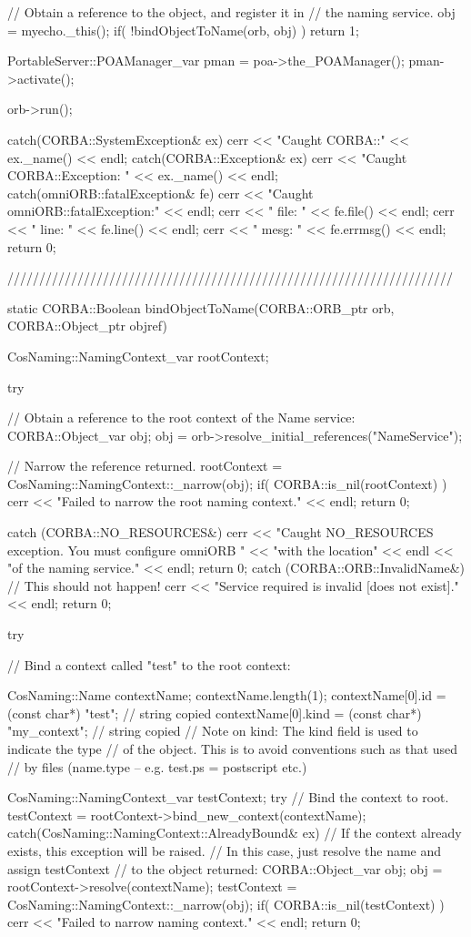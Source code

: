 \documentclass[11pt,twoside,a4paper]{book}
\begin{document}
\begin{cxxlisting}
{{    // Obtain a reference to the object, and register it in
    // the naming service.
    obj = myecho._this();
    if( !bindObjectToName(orb, obj) )
      return 1;

    PortableServer::POAManager_var pman = poa->the_POAManager();
    pman->activate();

    orb->run();
  }
  catch(CORBA::SystemException& ex) {
    cerr << "Caught CORBA::" << ex._name() << endl;
  }
  catch(CORBA::Exception& ex) {
    cerr << "Caught CORBA::Exception: " << ex._name() << endl;
  }
  catch(omniORB::fatalException& fe) {
    cerr << "Caught omniORB::fatalException:" << endl;
    cerr << "  file: " << fe.file() << endl;
    cerr << "  line: " << fe.line() << endl;
    cerr << "  mesg: " << fe.errmsg() << endl;
  }
  return 0;
}

//////////////////////////////////////////////////////////////////////

static CORBA::Boolean
bindObjectToName(CORBA::ORB_ptr orb, CORBA::Object_ptr objref)
{
  CosNaming::NamingContext_var rootContext;

  try {
    // Obtain a reference to the root context of the Name service:
    CORBA::Object_var obj;
    obj = orb->resolve_initial_references("NameService");

    // Narrow the reference returned.
    rootContext = CosNaming::NamingContext::_narrow(obj);
    if( CORBA::is_nil(rootContext) ) {
      cerr << "Failed to narrow the root naming context." << endl;
      return 0;
    }
  }
  catch (CORBA::NO_RESOURCES&) {
    cerr << "Caught NO_RESOURCES exception. You must configure omniORB "
	 << "with the location" << endl
	 << "of the naming service." << endl;
    return 0;
  }
  catch (CORBA::ORB::InvalidName&) {
    // This should not happen!
    cerr << "Service required is invalid [does not exist]." << endl;
    return 0;
  }

  try {
    // Bind a context called "test" to the root context:

    CosNaming::Name contextName;
    contextName.length(1);
    contextName[0].id   = (const char*) "test";       // string copied
    contextName[0].kind = (const char*) "my_context"; // string copied
    // Note on kind: The kind field is used to indicate the type
    // of the object. This is to avoid conventions such as that used
    // by files (name.type -- e.g. test.ps = postscript etc.)

    CosNaming::NamingContext_var testContext;
    try {
      // Bind the context to root.
      testContext = rootContext->bind_new_context(contextName);
    }
    catch(CosNaming::NamingContext::AlreadyBound& ex) {
      // If the context already exists, this exception will be raised.
      // In this case, just resolve the name and assign testContext
      // to the object returned:
      CORBA::Object_var obj;
      obj = rootContext->resolve(contextName);
      testContext = CosNaming::NamingContext::_narrow(obj);
      if( CORBA::is_nil(testContext) ) {
        cerr << "Failed to narrow naming context." << endl;
        return 0;
      }
    }

}}
\end{cxxlisting}
\end{document}
